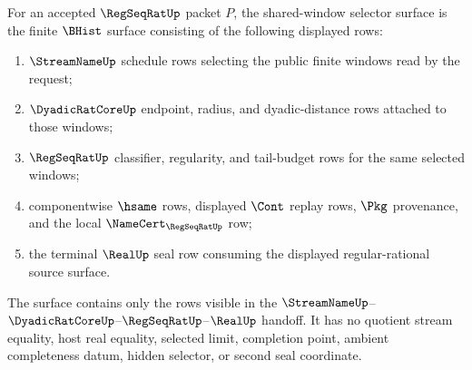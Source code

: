 \begin{definition}
\label{def:regseqrat-shared-window-selector-surface}
For an accepted $\RegSeqRatUp$ packet $P$, the shared-window selector surface is the finite $\BHist$ surface consisting of the following displayed rows:
\begin{enumerate}
\item $\StreamNameUp$ schedule rows selecting the public finite windows read by the request;
\item $\DyadicRatCoreUp$ endpoint, radius, and dyadic-distance rows attached to those windows;
\item $\RegSeqRatUp$ classifier, regularity, and tail-budget rows for the same selected windows;
\item componentwise $\hsame$ rows, displayed $\Cont$ replay rows, $\Pkg$ provenance, and the local $\NameCert_{\RegSeqRatUp}$ row;
\item the terminal $\RealUp$ seal row consuming the displayed regular-rational source surface.
\end{enumerate}
The surface contains only the rows visible in the $\StreamNameUp$--$\DyadicRatCoreUp$--$\RegSeqRatUp$--$\RealUp$ handoff. It has no quotient stream equality, host real equality, selected limit, completion point, ambient completeness datum, hidden selector, or second seal coordinate.
\end{definition}

